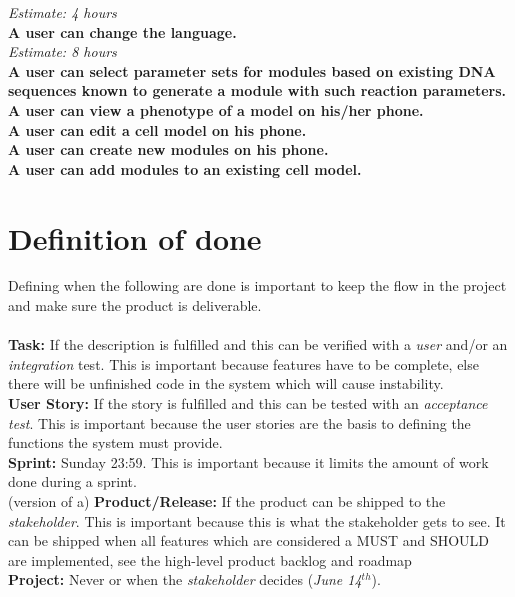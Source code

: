 \documentclass[10pt,a4paper]{report}
\begin{document}
		\indent
			\emph{Estimate: 4 hours} \\
		\textbf{A user can change the language.} \\
		\indent
			\emph{Estimate: 8 hours} \\
		\textbf{A user can select parameter sets for modules based on existing DNA sequences known to generate a module with such reaction parameters.} \\
		\textbf{A user can view a phenotype of a model on his/her phone.} \\
		\textbf{A user can edit a cell model on his phone.} \\
		\textbf{A user can create new modules on his phone.} \\
		\textbf{A user can add modules to an existing cell model.} \\

	\clearpage
	\section{Definition of done}
		Defining when the following are done is important to keep the flow in the project and make sure the product is deliverable. \\
		\\
		\textbf{Task:} If the description is fulfilled and this can be verified with a \emph{user} and/or an \emph{integration} test. {\scriptsize This is important because features have to be complete, else there will be unfinished code in the system which will cause instability.}\\
		\textbf{User Story:} If the story is fulfilled and this can be tested with an \emph{acceptance test}.  {\scriptsize This is important because the user stories are the basis to defining the functions the system must provide.}\\
		\textbf{Sprint:} Sunday 23:59. { \scriptsize This is important because it limits the amount of work done during a sprint.}\\
		(version of a) \textbf{Product/Release:} If the product can be shipped to the \emph{stakeholder}. { \scriptsize This is important because this is what the stakeholder gets to see. It can be shipped when all features which are considered a MUST and SHOULD are implemented, see the high-level product backlog and roadmap} \\
		\textbf{Project:} Never or when the \emph{stakeholder} decides (\emph{June 14$^{th}$}).

	\clearpage
\end{document}
